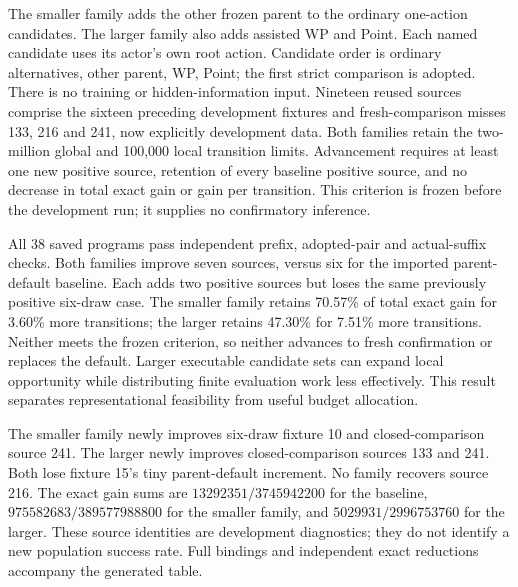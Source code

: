 The smaller family adds the other frozen parent to the ordinary one-action
candidates. The larger family also adds assisted WP and Point. Each named
candidate uses its actor's own root action. Candidate order is ordinary
alternatives, other parent, WP, Point; the first strict comparison is adopted.
There is no training or hidden-information input. Nineteen reused sources
comprise the sixteen preceding development fixtures and fresh-comparison
misses 133, 216 and 241, now explicitly development data. Both families retain
the two-million global and 100,000 local transition limits. Advancement requires
at least one new positive source, retention of every baseline positive source,
and no decrease in total exact gain or gain per transition. This criterion is
frozen before the development run; it supplies no confirmatory inference.

All 38 saved programs pass independent prefix, adopted-pair and actual-suffix
checks. Both families improve seven sources, versus six for the imported
parent-default baseline. Each adds two positive sources but loses the same
previously positive six-draw case. The smaller family retains 70.57\% of total
exact gain for 3.60\% more transitions; the larger retains 47.30\% for 7.51\%
more transitions. Neither meets the frozen criterion, so neither advances to
fresh confirmation or replaces the default. Larger executable candidate sets
can expand local opportunity while distributing finite evaluation work less
effectively. This result separates representational feasibility from useful
budget allocation.

\begin{table}[ht]
\centering\small

\caption{Named-continuation development. Gain ratio is summed exact increment
relative to the imported parent-default baseline, not a population win-rate
ratio. All nineteen reused sources remain in the denominator.}
\label{tab:continuation-development}
\end{table}

The smaller family newly improves six-draw fixture 10 and closed-comparison
source 241. The larger newly improves closed-comparison sources 133 and 241.
Both lose fixture 15's tiny parent-default increment. No family recovers
source 216. The exact gain sums are $13292351/3745942200$ for the baseline,
$975582683/389577988800$ for the smaller family, and $5029931/2996753760$ for
the larger. These source identities are development diagnostics; they do not
identify a new population success rate. Full bindings and independent exact
reductions accompany the generated table.

